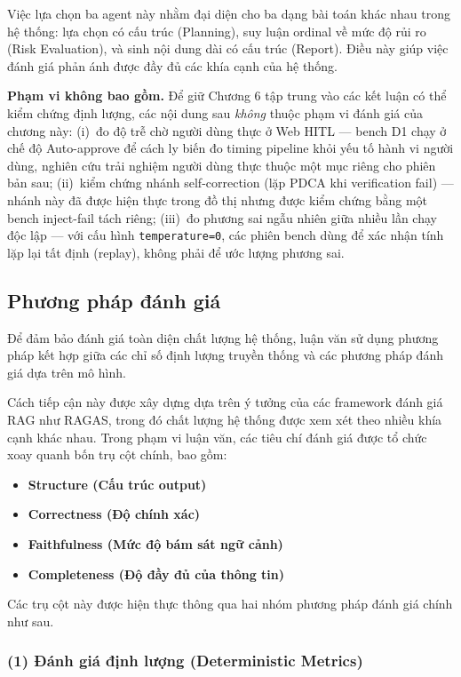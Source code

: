 Việc lựa chọn ba agent này nhằm đại diện cho ba dạng bài toán khác nhau trong hệ thống: lựa chọn có cấu trúc (Planning), suy luận ordinal về mức độ rủi ro (Risk Evaluation), và sinh nội dung dài có cấu trúc (Report). Điều này giúp việc đánh giá phản ánh được đầy đủ các khía cạnh của hệ thống.

\textbf{Phạm vi không bao gồm.} Để giữ Chương 6 tập trung vào các kết luận có thể kiểm chứng định lượng, các nội dung sau \emph{không} thuộc phạm vi đánh giá của chương này: (i)~đo độ trễ chờ người dùng thực ở Web HITL --- bench D1 chạy ở chế độ Auto-approve để cách ly biến đo timing pipeline khỏi yếu tố hành vi người dùng, nghiên cứu trải nghiệm người dùng thực thuộc một mục riêng cho phiên bản sau; (ii)~kiểm chứng nhánh self-correction (lặp PDCA khi verification fail) --- nhánh này đã được hiện thực trong đồ thị nhưng được kiểm chứng bằng một bench inject-fail tách riêng; (iii)~đo phương sai ngẫu nhiên giữa nhiều lần chạy độc lập --- với cấu hình \texttt{temperature=0}, các phiên bench dùng để xác nhận tính lặp lại tất định (replay), không phải để ước lượng phương sai.

\subsection{Phương pháp đánh giá}

Để đảm bảo đánh giá toàn diện chất lượng hệ thống, luận văn sử dụng phương pháp kết hợp giữa các chỉ số định lượng truyền thống và các phương pháp đánh giá dựa trên mô hình.

Cách tiếp cận này được xây dựng dựa trên ý tưởng của các framework đánh giá RAG như RAGAS, trong đó chất lượng hệ thống được xem xét theo nhiều khía cạnh khác nhau. Trong phạm vi luận văn, các tiêu chí đánh giá được tổ chức xoay quanh bốn trụ cột chính, bao gồm:

\begin{itemize}
    \item \textbf{Structure (Cấu trúc output)}
    \item \textbf{Correctness (Độ chính xác)}
    \item \textbf{Faithfulness (Mức độ bám sát ngữ cảnh)}
    \item \textbf{Completeness (Độ đầy đủ của thông tin)}
\end{itemize}

Các trụ cột này được hiện thực thông qua hai nhóm phương pháp đánh giá chính như sau.

\subsubsection*{(1) Đánh giá định lượng (Deterministic Metrics)}

